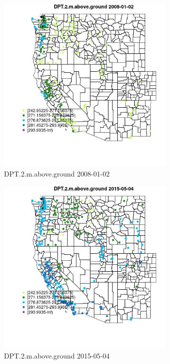 \begin{figure} 
\centering  
\includegraphics[width=0.77\textwidth]{Code_Outputs/Report_ML_input_PM25_Step4_part_e_de_duplicated_aves_compiled_2019-05-18wNAs_MapObsDPT2maboveground2008-01-02.jpg} 
\caption{\label{fig:Report_ML_input_PM25_Step4_part_e_de_duplicated_aves_compiled_2019-05-18wNAsMapObsDPT2maboveground2008-01-02}DPT.2.m.above.ground 2008-01-02} 
\end{figure} 
 

\begin{figure} 
\centering  
\includegraphics[width=0.77\textwidth]{Code_Outputs/Report_ML_input_PM25_Step4_part_e_de_duplicated_aves_compiled_2019-05-18wNAs_MapObsDPT2maboveground2015-05-04.jpg} 
\caption{\label{fig:Report_ML_input_PM25_Step4_part_e_de_duplicated_aves_compiled_2019-05-18wNAsMapObsDPT2maboveground2015-05-04}DPT.2.m.above.ground 2015-05-04} 
\end{figure} 
 

